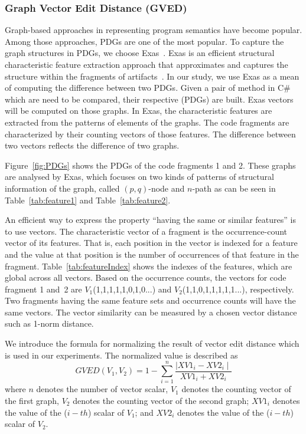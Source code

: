 \subsubsection{\textbf{Graph Vector Edit Distance (GVED)}}

Graph-based approaches in representing program semantics have become
popular. Among those approaches, PDGs are one of the most popular.  To
capture the graph structures in PDGs, we choose Exas~\cite{fase09}.
Exas is an efficient structural characteristic feature extraction
approach that approximates and captures the structure within the
fragments of artifacts~\cite{fase09}.  In our study, we use Exas as a
mean of computing the difference between two PDGs. Given a pair of
method in C\# which are need to be compared, their respective
(PDGs) are built.
Exas vectors will be computed on those graphs. In Exas, the
characteristic features are extracted from the patterns of elements of
the graphs. The code fragments are characterized by their counting
vectors of those features. The difference between two vectors reflects
the difference of two graphs.


Figure~\ref{fig:PDGs} shows the PDGs of the code fragments 1 and
2. These graphs are analysed by Exas, which focuses on two kinds of
patterns of structural information of the graph, called $\left(p,q\right)$-node
and $n$-path as can be seen in Table~\ref{tab:feature1} and
Table~\ref{tab:feature2}.

An efficient way to express the property ``having the same or similar
features'' is to use vectors. The characteristic vector of a fragment
is the occurrence-count vector of its features. That is, each position
in the vector is indexed for a feature and the value at that position
is the number of occurrences of that feature in the
fragment. Table~\ref{tab:featureIndex} shows the indexes of the
features, which are global across all vectors. Based on the occurrence
counts, the vectors for code fragment 1 and~2 are
$V_1$(1,1,1,1,1,0,1,0...) and $V_2$(1,1,0,1,1,1,1,1...),
respectively. Two fragments having the same feature sets and
occurrence counts will have the same vectors. The
vector similarity can be measured by a chosen vector distance such as
1-norm distance.

We introduce the formula for normalizing the result of vector edit
distance which is used in our experiments. The normalized
value is described as
\[GVED \left( V_1, V_2 \right) = 1 - \sum_{i=1}^{n} \frac{ \mid XV1_i - XV2_i \mid}{XV1_i + XV2_i}\]
where $n$ denotes the number of vector scalar, $V_1$ denotes the
counting vector of the first graph, $V_2$ denotes the counting vector
of the second graph; $XV1_i$ denotes the value of the ($i-th$) scalar
of $V_1$; and $XV2_i$ denotes the value of the ($i-th$) scalar of
$V_2$.

